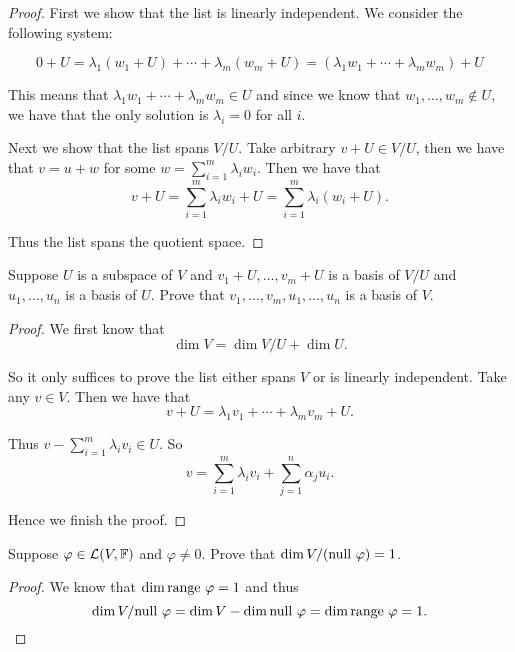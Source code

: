 \documentclass{extarticle}
\begin{document}
\begin{proof}
First we show that the list is linearly independent.  We consider the following system:

\[0 + U = \lambda_1(w_1 + U) + \cdots + \lambda_m (w_m + U) = (\lambda_1 w_1 
+ \cdots + \lambda_m w_m) + U\]

This means that \( \lambda_1 w_1 
+ \cdots + \lambda_m w_m \in U\) and since we know that \(w_1, \ldots, w_m \notin U\), we have 
that the only solution is \(\lambda_i = 0\) for all \(i\). 

Next we show that the list spans \(V / U\). Take arbitrary \(v + U \in V / U\), then we have that 
\(v = u + w\) for some \(w = \sum_{i=1}^{m} \lambda_i w_i\). Then we have that 
\[v + U = \sum_{i=1}^{m} \lambda_i w_i + U = \sum_{i=1}^{m} \lambda_i (w_i + U).\]

Thus the list spans the quotient space. 

\end{proof}


\begin{problem}{15}
    Suppose \(U\) is a subspace of \(V\) and \(v_1 + U, \ldots, v_m + U\) is a basis of 
    \(V /U\) and \(u_1, \ldots, u_n\) is a basis of \(U\). Prove that 
    \(v_1, \ldots, v_m, u_1, \ldots, u_n\) is a basis of \(V\). 
\end{problem}

\begin{proof}
We first know that 
\[\dim V = \dim V / U + \dim U.\]

So it only suffices to prove the list either spans \(V\) or is linearly independent. Take 
any \(v \in V\). Then we have that 
\[v + U = \lambda_1 v_1 + \cdots + \lambda_m v_m + U.\]

Thus \(v - \sum_{i=1}^{m}\lambda_i v_i \in U\). So 
\[v = \sum_{i=1}^{m} \lambda_i v_i + \sum_{j=1}^{n} \alpha_j u_i.\]

Hence we finish the proof. 
\end{proof}


\begin{problem}{16}
    Suppose \(\varphi \in \mathcal{L}(V, \mathbb{F})\) and  \(\varphi \neq 0\). Prove that 
    \(\dim V / (\text{null } \varphi) = 1\). 
\end{problem}

\begin{proof}

We know that \(\dim \text{range } \varphi  = 1 \) and thus 
\[\dim V / \text{null } \varphi = \dim V  - \dim \text{null } \varphi = \dim \text{range } \varphi = 1.\]

\end{proof}
\end{document}
